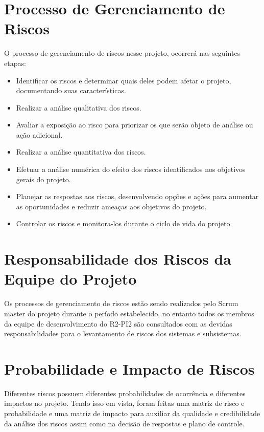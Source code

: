 \section{Processo de Gerenciamento de Riscos} %
\label{sec:processo_de_gerenciamento_de_riscos}
	
	O processo de gerenciamento de riscos nesse projeto, ocorrerá nas seguintes etapas:
	\begin{itemize}
		\item Identificar os riscos e determinar quais deles podem afetar o projeto, documentando suas características.
		\item Realizar a análise qualitativa dos riscos.
		\item Avaliar a exposição ao risco para priorizar os que serão objeto de análise ou ação adicional. 
		\item Realizar a análise quantitativa dos riscos.
		\item Efetuar a análise numérica do efeito dos riscos identificados nos objetivos gerais do projeto.
		\item Planejar as respostas aos riscos, desenvolvendo opções e ações para aumentar as oportunidades e reduzir ameaças aos objetivos do projeto.
		\item Controlar os riscos e monitora-los durante o ciclo de vida do projeto.

	\end{itemize}

\section{Responsabilidade dos Riscos da Equipe do Projeto} %
\label{sec:responsabilidade_dos_riscos_da_equipe_do_projeto}

Os processos de gerenciamento de riscos estão sendo realizados pelo Scrum master do projeto durante o período estabelecido, no entanto todos os membros da equipe de desenvolvimento do R2-PI2 são consultados com as devidas responsabilidades para o levantamento de riscos dos sistemas e subsistemas.

\section{Probabilidade e Impacto de Riscos} %
 \label{sec:probabilidade_e_impacto_de_riscos}
 
 Diferentes riscos possuem diferentes probabilidades de ocorrência e diferentes impactos no projeto. Tendo isso em vista, foram feitas uma matriz de risco e probabilidade e uma matriz de impacto para auxiliar da qualidade e credibilidade da análise dos riscos assim como na decisão de respostas e plano de controle.


